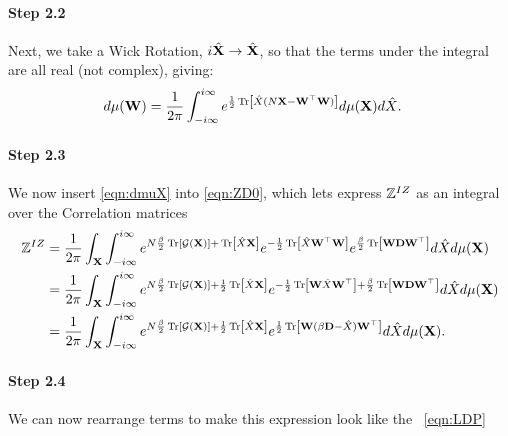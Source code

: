 \paragraph{Step 2.2}
Next, we take a Wick Rotation, $i\hat{\mathbf{X}}\rightarrow \hat{\mathbf{X}}$, so that the terms under the integral are all real (not complex), giving:
\begin{align}
  \label{eqn:dmuX}
  d\mu(\mathbf{W}) &= \frac{1}{2\pi}\int_{-i\infty}^{i\infty} e^{\frac{1}{2}\mbox{}\operatorname{Tr}\left[\hat{X}(N\mathbf{X}-\mathbf{W}^{\top}\mathbf{W})\right]} d\mu(\mathbf{X})d\hat{X}  .
\end{align}

\paragraph{Step 2.3}
We now insert \ref{eqn:dmuX} into \ref{eqn:ZD0}, which lets
express $\mathbb{Z}^{IZ}$ as an integral over the \Teacher Correlation matrices
\begin{align}
  \nonumber
  \mathbb{Z}^{IZ}&=
  \frac{1}{2\pi} \int_{\mathbf{X}}  \int_{-i\infty}^{i\infty}
  e^{N\frac{\beta}{2} \mbox{}\operatorname{Tr}\left[\mathcal{G}(\mathbf{X})\right]+\mbox{}\operatorname{Tr}\left[\hat{X}\mathbf{X}\right] }
  e^{-\frac{1}{2}\mbox{}\operatorname{Tr}\left[\hat{X}\mathbf{W}^{\top}\mathbf{W}\right]}
  e^{\frac{\beta}{2}\mbox{}\operatorname{Tr}\left[\mathbf{W}\mathbf{D}\mathbf{W}^{\top}\right]}
  d\hat{X}  
  d\mu(\mathbf{\mathbf{X}}) \\ 
  \nonumber
  &=
  \frac{1}{2\pi} \int_{\mathbf{X}}  \int_{-i\infty}^{i\infty}
  e^{N\frac{\beta}{2}\mbox{}\operatorname{Tr}\left[\mathcal{G}(\mathbf{X})\right]+ \frac{1}{2}\mbox{}\operatorname{Tr}\left[\hat{X}\mathbf{X}\right]}
  e^{-\frac{1}{2}\mbox{}\operatorname{Tr}\left[\mathbf{W}\hat{X}\mathbf{W}^{\top}\right]+
  \frac{\beta}{2}\mbox{}\operatorname{Tr}\left[\mathbf{W}\mathbf{D}\mathbf{W}^{\top}\right]}
  d\hat{X}  
  d\mu(\mathbf{\mathbf{X}}) \\ 
  \label{eqn:ZD3}
    &=
  \frac{1}{2\pi} \int_{\mathbf{X}}  \int_{-i\infty}^{i\infty}
  e^{N\frac{\beta}{2}\mbox{}\operatorname{Tr}\left[\mathcal{G}(\mathbf{X})\right]+
  \frac{1}{2}\mbox{}\operatorname{Tr}\left[\hat{X}\mathbf{X}\right]}
  e^{\frac{1}{2}\mbox{}\operatorname{Tr}\left[\mathbf{W}(\beta\mathbf{D}-\hat{X})\mathbf{W}^{\top}\right]}
  d\hat{X}  
  d\mu(\mathbf{\mathbf{X}})  .
\end{align}

\paragraph{Step 2.4}
We can now rearrange terms to make this expression look like the \EQN~\ref{eqn:LDP}


